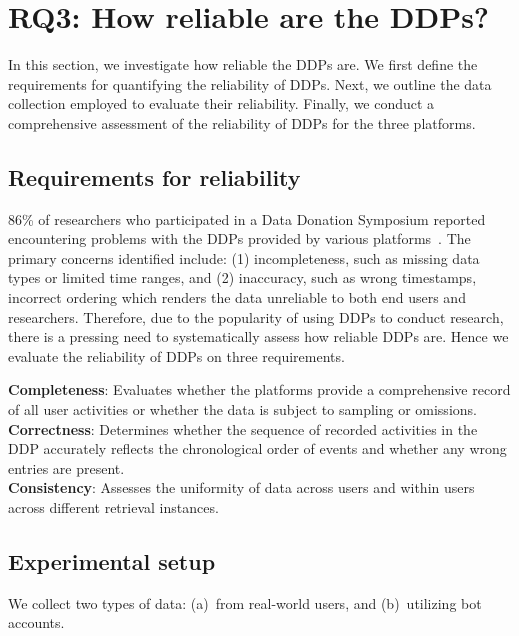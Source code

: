 \section{RQ3: How reliable are the DDPs?}
\label{Sec: Reliability}

In this section, we investigate how reliable the DDPs are.
We first define the requirements for quantifying the reliability of DDPs.
Next, we outline the data collection employed to evaluate their reliability.
Finally, we conduct a comprehensive assessment of the reliability of DDPs for the three platforms. 

\subsection{Requirements for reliability}
\label{Sec: Reliability_Desiderata}

86\% of researchers who participated in a Data Donation Symposium 
reported encountering problems with the DDPs provided by various platforms~\cite{valkenburg2024time}.
The primary concerns identified include: (1) incompleteness, such as missing data types or limited time ranges, and (2) inaccuracy, such as wrong timestamps, incorrect ordering which renders the data unreliable to both end users and researchers. 
Therefore, due to the popularity of using DDPs to conduct research, there is a pressing need to systematically assess how reliable DDPs are.
Hence we evaluate the reliability of DDPs on three requirements.


\noindent
\textbf{Completeness}: Evaluates whether the platforms provide a comprehensive record of all user activities or whether the data is subject to sampling or omissions.\\ 
\noindent
\textbf{Correctness}: Determines whether the sequence of recorded activities in the DDP accurately reflects the chronological order of events and whether any wrong entries are present.\\
\noindent
\textbf{Consistency}: Assesses the uniformity of data across users and within users across different retrieval instances.


\subsection{Experimental setup}
\label{Sec: Reliability_Experimental_Setup}

We collect two types of  data: (a)~from real-world users, and (b)~utilizing bot accounts.



